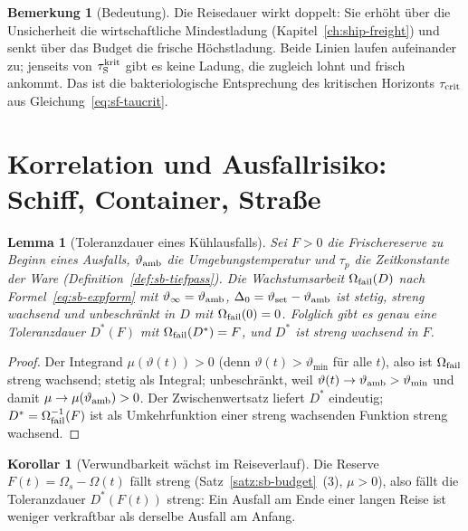 \documentclass[a4paper, 12pt, twoside, openright]{report}
\newtheorem{lemma}[theorem]{Lemma}
\theoremstyle{definition}
\theoremstyle{definition}
\newtheorem{bemerkung}{Bemerkung}[chapter]
\newtheorem{korollar}{Korollar}[chapter]
\begin{document}
\begin{bemerkung}[Bedeutung]
Die Reisedauer wirkt doppelt: Sie erhöht über die Unsicherheit die wirtschaftliche
Mindestladung (Kapitel~\ref{ch:ship-freight}) und senkt über das Budget die frische
Höchstladung. Beide Linien laufen aufeinander zu; jenseits von $\tau_{\mathrm S}^{\rm krit}$ gibt
es keine Ladung, die zugleich lohnt und frisch ankommt. Das ist die bakteriologische
Entsprechung des kritischen Horizonts $\tau_{\rm crit}$ aus Gleichung~\eqref{eq:sf-taucrit}.
\end{bemerkung}

\section{Korrelation und Ausfallrisiko: Schiff, Container, Straße}
\label{sec:sb-risiko}

\begin{lemma}[Toleranzdauer eines Kühlausfalls]\label{lem:sb-dstar}
Sei $F>0$ die Frischereserve zu Beginn eines Ausfalls, $\vartheta_{\rm amb}$ die
Umgebungstemperatur und $\tau_p$ die Zeitkonstante der Ware (Definition~\ref{def:sb-tiefpass}).
Die Wachstumsarbeit $\Omega_{\rm fail}(D)$ nach Formel~\eqref{eq:sb-expform} mit
$\vartheta_\infty=\vartheta_{\rm amb}$, $\Delta_0=\vartheta_{\rm set}-\vartheta_{\rm amb}$ ist
stetig, streng wachsend und unbeschränkt in $D$ mit $\Omega_{\rm fail}(0)=0$. Folglich gibt es
genau eine \emph{Toleranzdauer} $D^\ast(F)$ mit $\Omega_{\rm fail}(D^\ast)=F$, und $D^\ast$
ist streng wachsend in $F$.
\end{lemma}

\begin{proof}
Der Integrand $\mu(\vartheta(t))>0$ (denn $\vartheta(t)>\vartheta_{\min}$ für alle $t$), also ist
$\Omega_{\rm fail}$ streng wachsend; stetig als Integral; unbeschränkt, weil
$\vartheta(t)\to\vartheta_{\rm amb}>\vartheta_{\min}$ und damit $\mu\to\mu(\vartheta_{\rm amb})>0$. Der
Zwischenwertsatz liefert $D^\ast$ eindeutig; $D^\ast=\Omega_{\rm fail}^{-1}(F)$ ist als
Umkehrfunktion einer streng wachsenden Funktion streng wachsend.
\end{proof}

\begin{korollar}[Verwundbarkeit wächst im Reiseverlauf]\label{kor:sb-verwund}
Die Reserve $F(t)=\Omega_s-\Omega(t)$ fällt streng (Satz~\ref{satz:sb-budget}~(3), $\mu>0$),
also fällt die Toleranzdauer $D^\ast(F(t))$ streng: Ein Ausfall am Ende einer langen Reise
ist weniger verkraftbar als derselbe Ausfall am Anfang.
\end{korollar}
\end{document}
